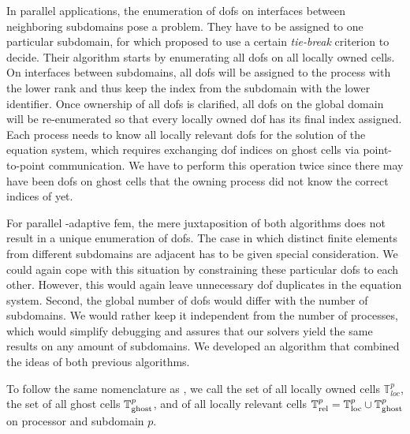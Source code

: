 

In parallel applications, the enumeration of \glspl{dof} on interfaces between neighboring subdomains pose a problem. They have to be assigned to one particular subdomain, for which \textcite[Sec.~3.1]{bangerth2012} proposed to use a certain \textit{tie-break} criterion to decide. Their algorithm starts by enumerating all \glspl{dof} on all locally owned cells. On interfaces between subdomains, all \glspl{dof} will be assigned to the process with the lower rank and thus keep the index from the subdomain with the lower identifier. Once ownership of all \glspl{dof} is clarified, all \glspl{dof} on the global domain will be re-enumerated so that every locally owned \gls{dof} has its final index assigned. Each process needs to know all locally relevant \glspl{dof} for the solution of the equation system, which requires exchanging \gls{dof} indices on ghost cells via point-to-point communication. We have to perform this operation twice since there may have been \glspl{dof} on ghost cells that the owning process did not know the correct indices of yet.

For parallel \hp-adaptive \gls{fem}, the mere juxtaposition of both algorithms does not result in a unique enumeration of \glspl{dof}. The case in which distinct finite elements from different subdomains are adjacent has to be given special consideration. We could again cope with this situation by constraining these particular \glspl{dof} to each other. However, this would again leave unnecessary \gls{dof} duplicates in the equation system. Second, the global number of \glspl{dof} would differ with the number of subdomains. We would rather keep it independent from the number of processes, which would simplify debugging and assures that our solvers yield the same results on any amount of subdomains. We developed an algorithm that combined the ideas of both previous algorithms.

To follow the same nomenclature as \cite{bangerth2012}, we call the set of all locally owned cells $\mathbb{T}^p_{loc}$, the set of all ghost cells $\mathbb{T}^p_{\text{ghost}}$, and of all locally relevant cells $\mathbb{T}^p_{\text{rel}} = \mathbb{T}^p_{\text{loc}} \cup \mathbb{T}^p_{\text{ghost}}$ on processor and subdomain $p$.


